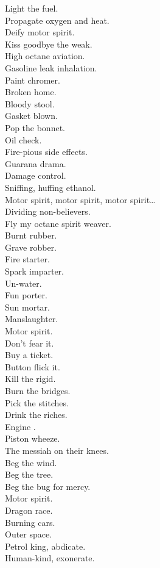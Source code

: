 Light the fuel. \\
Propagate oxygen and heat. \\
Deify motor spirit. \\
Kiss goodbye the weak. \\

High octane aviation. \\
Gasoline leak inhalation. \\
Paint chromer. \\
Broken home. \\
Bloody stool. \\
Gasket blown. \\
Pop the bonnet. \\
Oil check. \\
Fire-pious side effects. \\
Guarana drama. \\
Damage control. \\
Sniffing, huffing ethanol. \\

Motor spirit, motor spirit, motor spirit… \\

Dividing non-believers. \\
Fly my octane spirit weaver. \\

Burnt rubber. \\
Grave robber. \\
Fire starter. \\
Spark imparter. \\
Un-water. \\
Fun porter. \\
Sun mortar. \\
Manslaughter. \\
Motor spirit. \\
Don't fear it. \\
Buy a ticket. \\
Button flick it. \\
Kill the rigid. \\
Burn the bridges. \\
Pick the stitches. \\
Drink the riches. \\

Engine . \\
Piston wheeze. \\
The messiah on their knees. \\
Beg the wind. \\
Beg the tree. \\
Beg the bug for mercy. \\
Motor spirit. \\
Dragon race. \\
Burning cars. \\
Outer space. \\
Petrol king, abdicate. \\
Human-kind, exonerate. \\

